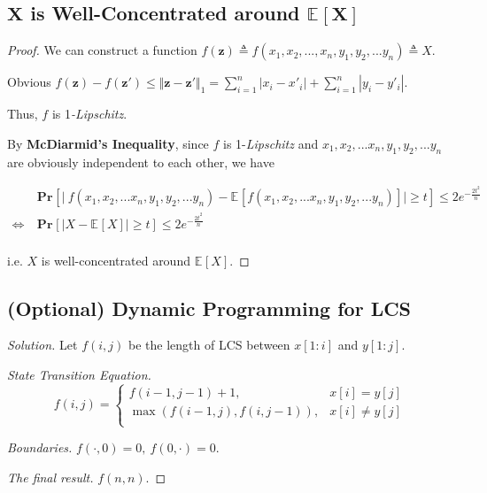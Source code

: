 \documentclass{article}
\renewcommand{\Pr}[2]{\mathbf{Pr}_{#1}\left[#2\right]}
\newcommand{\staExp}[2]{\mathbb{E}_{#1}\left[#2\right]}
\newenvironment{solution}{\begin{proof}[\noindent\it Solution]}{\end{proof}}
\begin{document}
\subsection{$\boldsymbol{X}$ is Well-Concentrated around $\boldsymbol{\staExp{}{X}}$}
\vspace{1em}
\begin{proof}
    We can construct a function $f(\boldsymbol{z})\triangleq f(x_1,x_2,...,x_n,y_1,y_2,...y_n)\triangleq X$. 
    
    \hspace{1.3em}
    Obvious $f(\boldsymbol{z})-f(\boldsymbol{z'})\le\Vert\boldsymbol{z-z'}\Vert_1 = \sum_{i=1}^n|x_i-x'_i|+\sum_{i=1}^n|y_i-y'_i|.$
    
    \hspace{1.3em}
    Thus, $f$ is 1\textit{-Lipschitz}.
    
    \hspace{1.3em}
    By \textbf{McDiarmid's Inequality}, since $f$ is 1-\textit{Lipschitz} and $x_1,x_2,...x_n,y_1,y_2,...y_n$ are obviously independent to each other, we have
    
    \vspace{-3em}
    \begin{align*}
        &\Pr{}{\Big|\ f(x_1,x_2,...x_n,y_1,y_2,...y_n)-\staExp{}{f(x_1,x_2,...x_n,y_1,y_2,...y_n)}\Big|\geq t}\le 2e^{-\frac{2t^2}{n}} \\
        \Longleftrightarrow\  &\Pr{}{\big|X-\staExp{}{X}\big|\geq t}\le 2e^{-\frac{2t^2}{n}} \\
    \end{align*}
    
    \vspace{-1em} \hspace{1.3em}
    i.e. $X$ is well-concentrated around $\staExp{}{X}$.
\end{proof}

\vspace{3em}
\subsection{(Optional) Dynamic Programming for LCS}
\vspace{1em}
\begin{solution}
    Let $f(i,j)$ be the length of LCS between $x[1:i]$ and $y[1:j]$.
    
    \vspace{1em} \hspace{2.5em}
    \textit{State Transition Equation.}
    $$f(i,j)=\left\{\begin{array}{ll}
        f(i-1,j-1)+1, & x[i]=y[j] \\
        \max(f(i-1,j),f(i,j-1)), & x[i]\neq y[j] \\
    \end{array}\right.$$
    
    \vspace{1em} \hspace{2.5em}
    \textit{Boundaries.} $f(\cdot,0)=0,\ f(0,\cdot)=0.$
    
    \vspace{1em} \hspace{2.5em}
    \textit{The final result.} $f(n,n)$.
\end{solution}
    
\end{document}
